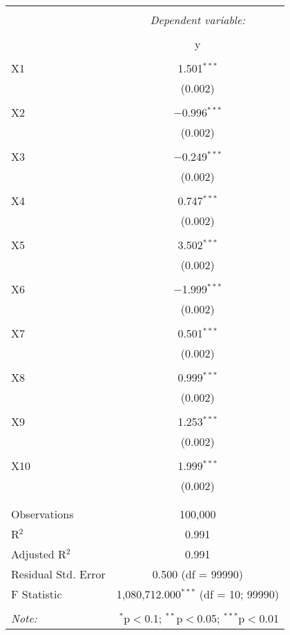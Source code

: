 \documentclass{article}
\begin{document}
\begin{table}[!htbp] \centering 
  \caption{} 
  \label{} 
\begin{tabular}{@{\extracolsep{5pt}}lc} 
\\[-1.8ex]\hline 
\hline \\[-1.8ex] 
 & \multicolumn{1}{c}{\textit{Dependent variable:}} \\ 
\cline{2-2} 
\\[-1.8ex] & y \\ 
\hline \\[-1.8ex] 
 X1 & 1.501$^{***}$ \\ 
  & (0.002) \\ 
  & \\ 
 X2 & $-$0.996$^{***}$ \\ 
  & (0.002) \\ 
  & \\ 
 X3 & $-$0.249$^{***}$ \\ 
  & (0.002) \\ 
  & \\ 
 X4 & 0.747$^{***}$ \\ 
  & (0.002) \\ 
  & \\ 
 X5 & 3.502$^{***}$ \\ 
  & (0.002) \\ 
  & \\ 
 X6 & $-$1.999$^{***}$ \\ 
  & (0.002) \\ 
  & \\ 
 X7 & 0.501$^{***}$ \\ 
  & (0.002) \\ 
  & \\ 
 X8 & 0.999$^{***}$ \\ 
  & (0.002) \\ 
  & \\ 
 X9 & 1.253$^{***}$ \\ 
  & (0.002) \\ 
  & \\ 
 X10 & 1.999$^{***}$ \\ 
  & (0.002) \\ 
  & \\ 
\hline \\[-1.8ex] 
Observations & 100,000 \\ 
R$^{2}$ & 0.991 \\ 
Adjusted R$^{2}$ & 0.991 \\ 
Residual Std. Error & 0.500 (df = 99990) \\ 
F Statistic & 1,080,712.000$^{***}$ (df = 10; 99990) \\ 
\hline 
\hline \\[-1.8ex] 
\textit{Note:}  & \multicolumn{1}{r}{$^{*}$p$<$0.1; $^{**}$p$<$0.05; $^{***}$p$<$0.01} \\ 
\end{tabular} 
\end{table} 
\end{document}
